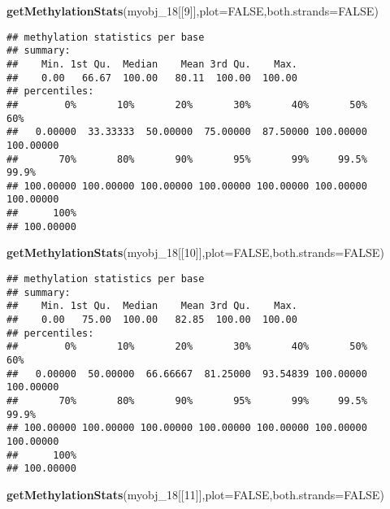 \documentclass[]{article}
\newenvironment{Shaded}{\begin{snugshade}}{\end{snugshade}}
\newcommand{\KeywordTok}[1]{\textcolor[rgb]{0.13,0.29,0.53}{\textbf{#1}}}
\newcommand{\DataTypeTok}[1]{\textcolor[rgb]{0.13,0.29,0.53}{#1}}
\newcommand{\DecValTok}[1]{\textcolor[rgb]{0.00,0.00,0.81}{#1}}
\newcommand{\OtherTok}[1]{\textcolor[rgb]{0.56,0.35,0.01}{#1}}
\newcommand{\NormalTok}[1]{#1}
\begin{document}
\begin{Shaded}
\begin{Highlighting}[]
\KeywordTok{getMethylationStats}\NormalTok{(myobj_}\DecValTok{18}\NormalTok{[[}\DecValTok{9}\NormalTok{]],}\DataTypeTok{plot=}\OtherTok{FALSE}\NormalTok{,}\DataTypeTok{both.strands=}\OtherTok{FALSE}\NormalTok{)}
\end{Highlighting}
\end{Shaded}

\begin{verbatim}
## methylation statistics per base
## summary:
##    Min. 1st Qu.  Median    Mean 3rd Qu.    Max. 
##    0.00   66.67  100.00   80.11  100.00  100.00 
## percentiles:
##        0%       10%       20%       30%       40%       50%       60% 
##   0.00000  33.33333  50.00000  75.00000  87.50000 100.00000 100.00000 
##       70%       80%       90%       95%       99%     99.5%     99.9% 
## 100.00000 100.00000 100.00000 100.00000 100.00000 100.00000 100.00000 
##      100% 
## 100.00000
\end{verbatim}

\begin{Shaded}
\begin{Highlighting}[]
\KeywordTok{getMethylationStats}\NormalTok{(myobj_}\DecValTok{18}\NormalTok{[[}\DecValTok{10}\NormalTok{]],}\DataTypeTok{plot=}\OtherTok{FALSE}\NormalTok{,}\DataTypeTok{both.strands=}\OtherTok{FALSE}\NormalTok{)}
\end{Highlighting}
\end{Shaded}

\begin{verbatim}
## methylation statistics per base
## summary:
##    Min. 1st Qu.  Median    Mean 3rd Qu.    Max. 
##    0.00   75.00  100.00   82.85  100.00  100.00 
## percentiles:
##        0%       10%       20%       30%       40%       50%       60% 
##   0.00000  50.00000  66.66667  81.25000  93.54839 100.00000 100.00000 
##       70%       80%       90%       95%       99%     99.5%     99.9% 
## 100.00000 100.00000 100.00000 100.00000 100.00000 100.00000 100.00000 
##      100% 
## 100.00000
\end{verbatim}

\begin{Shaded}
\begin{Highlighting}[]
\KeywordTok{getMethylationStats}\NormalTok{(myobj_}\DecValTok{18}\NormalTok{[[}\DecValTok{11}\NormalTok{]],}\DataTypeTok{plot=}\OtherTok{FALSE}\NormalTok{,}\DataTypeTok{both.strands=}\OtherTok{FALSE}\NormalTok{)}
\end{Highlighting}
\end{Shaded}
\end{document}
